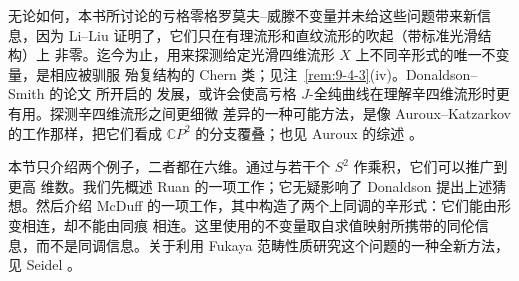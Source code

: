 无论如何，本书所讨论的亏格零格罗莫夫--威滕不变量并未给这些问题带来新信息，因为
Li--Liu  证明了，它们只在有理流形和直纹流形的吹起（带标准光滑结构）上
非零。迄今为止，用来探测给定光滑四维流形 $X$ 上不同辛形式的唯一不变量，是相应被驯服
殆复结构的 Chern 类；见注~\ref{rem:9-4-3}(iv)。Donaldson--Smith 的论文  所开启的
发展，或许会使高亏格 $J$-全纯曲线在理解辛四维流形时更有用。探测辛四维流形之间更细微
差异的一种可能方法，是像 Auroux--Katzarkov  的工作那样，把它们看成
$\mathbb CP^2$ 的分支覆叠；也见 Auroux 的综述 。

本节只介绍两个例子，二者都在六维。通过与若干个 $S^2$ 作乘积，它们可以推广到更高
维数。我们先概述 Ruan 的一项工作；它无疑影响了 Donaldson 提出上述猜想。然后介绍
McDuff 的一项工作，其中构造了两个上同调的辛形式：它们能由形变相连，却不能由同痕
相连。这里使用的不变量取自求值映射所携带的同伦信息，而不是同调信息。关于利用 Fukaya
范畴性质研究这个问题的一种全新方法，见 Seidel 。

